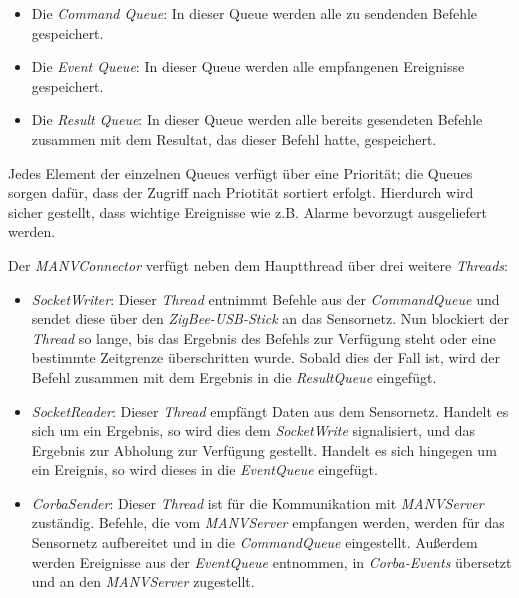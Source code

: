 \begin{itemize}
    \item{Die \emph{Command Queue}:} In dieser Queue werden alle zu sendenden Befehle gespeichert.
    \item{Die \emph{Event Queue}:} In dieser Queue werden alle empfangenen Ereignisse gespeichert.
    \item{Die \emph{Result Queue}:} In dieser Queue werden alle bereits gesendeten Befehle zusammen mit dem
                             Resultat, das dieser Befehl hatte, gespeichert.
\end{itemize}

Jedes Element der einzelnen Queues verfügt über eine Priorität; die Queues sorgen dafür, dass der
Zugriff nach Priotität sortiert erfolgt. Hierdurch wird sicher gestellt, dass wichtige Ereignisse
wie z.B. Alarme bevorzugt ausgeliefert werden.

Der \emph{MANVConnector} verfügt neben dem Hauptthread über drei weitere \emph{Threads}:

\begin{itemize}
    \item{\emph{SocketWriter}:} Dieser \emph{Thread} entnimmt Befehle aus der \emph{CommandQueue} und sendet
                         diese über den \emph{ZigBee-USB-Stick} an das Sensornetz. Nun blockiert der
                         \emph{Thread} so lange, bis das Ergebnis des Befehls zur Verfügung steht oder
                         eine bestimmte Zeitgrenze überschritten wurde.
                         Sobald dies der Fall ist, wird der Befehl zusammen mit dem Ergebnis in
                         die \emph{ResultQueue} eingefügt. 
    \item{\emph{SocketReader}:} Dieser \emph{Thread} empfängt Daten aus dem Sensornetz. Handelt es sich um ein
                         Ergebnis, so wird dies dem \emph{SocketWrite} signalisiert, und das
                         Ergebnis zur Abholung zur Verfügung gestellt. Handelt es sich hingegen um ein
                         Ereignis, so wird dieses
                         in die \emph{EventQueue} eingefügt.
    \item{\emph{CorbaSender}:} Dieser \emph{Thread} ist für die Kommunikation mit \emph{MANVServer} zuständig.
                         Befehle, die vom \emph{MANVServer} empfangen werden, werden für das 
                         Sensornetz aufbereitet und in die \emph{CommandQueue} eingestellt.
                         Außerdem werden Ereignisse aus der \textsl{EventQueue} entnommen,
                         in \emph{Corba-Events} übersetzt und an den \emph{MANVServer} zugestellt.
\end{itemize}                          

